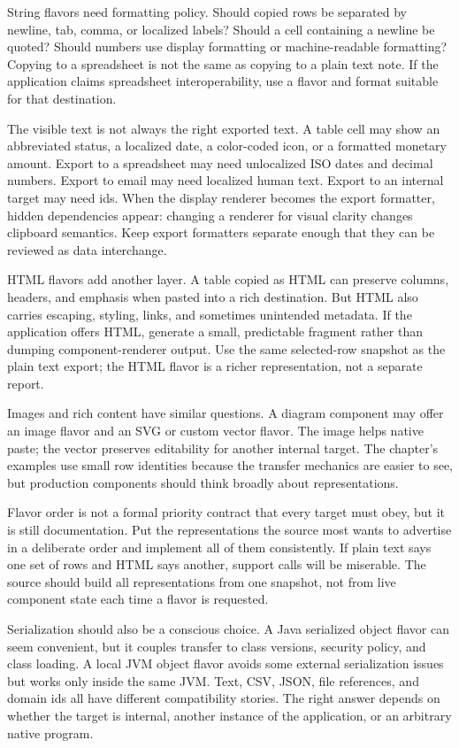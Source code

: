String flavors need formatting policy. Should copied rows be separated by newline, tab, comma, or localized labels? Should a cell containing a newline be quoted? Should numbers use display formatting or machine-readable formatting? Copying to a spreadsheet is not the same as copying to a plain text note. If the application claims spreadsheet interoperability, use a flavor and format suitable for that destination.

The visible text is not always the right exported text. A table cell may show an abbreviated status, a localized date, a color-coded icon, or a formatted monetary amount. Export to a spreadsheet may need unlocalized ISO dates and decimal numbers. Export to email may need localized human text. Export to an internal target may need ids. When the display renderer becomes the export formatter, hidden dependencies appear: changing a renderer for visual clarity changes clipboard semantics. Keep export formatters separate enough that they can be reviewed as data interchange.

HTML flavors add another layer. A table copied as HTML can preserve columns, headers, and emphasis when pasted into a rich destination. But HTML also carries escaping, styling, links, and sometimes unintended metadata. If the application offers HTML, generate a small, predictable fragment rather than dumping component-renderer output. Use the same selected-row snapshot as the plain text export; the HTML flavor is a richer representation, not a separate report.

Images and rich content have similar questions. A diagram component may offer an image flavor and an SVG or custom vector flavor. The image helps native paste; the vector preserves editability for another internal target. The chapter's examples use small row identities because the transfer mechanics are easier to see, but production components should think broadly about representations.

Flavor order is not a formal priority contract that every target must obey, but it is still documentation. Put the representations the source most wants to advertise in a deliberate order and implement all of them consistently. If plain text says one set of rows and HTML says another, support calls will be miserable. The source should build all representations from one snapshot, not from live component state each time a flavor is requested.

Serialization should also be a conscious choice. A Java serialized object flavor can seem convenient, but it couples transfer to class versions, security policy, and class loading. A local JVM object flavor avoids some external serialization issues but works only inside the same JVM. Text, CSV, JSON, file references, and domain ids all have different compatibility stories. The right answer depends on whether the target is internal, another instance of the application, or an arbitrary native program.

